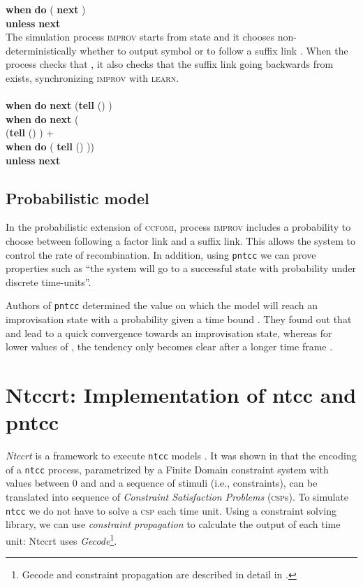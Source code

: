 \documentclass[english]{llncs}
\begin{document}
   \textbf{when}  \textbf{do} (  \textbf{next} ) \\
\hspace*{60pt} \textbf{unless}  \textbf{next}  \\

The simulation process \textsc{improv} starts from state  and it chooses non-deterministically
whether to output symbol  or to follow a suffix link . When the process checks that , it also checks that the suffix link going backwards from  exists, synchronizing \textsc{improv} with \textsc{learn}.\\

   \\
\hspace*{28pt} \textbf{when}  \textbf{do} \textbf{next} (\textbf{tell} ()  )  \\
\hspace*{24pt} \textbf{when}  \textbf{do}  \textbf{next} (\\
\hspace*{40pt} (\textbf{tell} ()  
 )  +\\
\hspace*{42pt} \textbf{when}
 \textbf{do} ( \textbf{tell} () ))\\
\hspace*{23pt} \textbf{unless}   \textbf{next}  

\subsection{Probabilistic model}
In the probabilistic extension of \textsc{ccfomi}, process \textsc{improv} includes a probability \textbf{} to choose between following a factor link and a suffix link. This allows the system to control the rate of recombination.
In addition, using \texttt{pntcc} we can prove properties such as ``the system will go to a successful state with probability  under  discrete time-units''.
 
Authors of \texttt{pntcc} determined the value on which the model will reach an improvisation state with a
probability  given 
a time bound . They found out that  and  lead to a quick convergence towards an
improvisation state, whereas for lower values of , the tendency only becomes clear after a longer time frame \cite{perez09}.

\section{Ntccrt: Implementation of ntcc and pntcc}
\textit{Ntccrt} is a framework to execute \texttt{ntcc} models \cite{toro08}.
It was shown in \cite{toro-report09} that the encoding of a 
\texttt{ntcc} process, parametrized by a Finite Domain constraint system with values between 0 and  and a sequence of stimuli (i.e., constraints), can be translated into  sequence of \textit{Constraint Satisfaction Problems} (\textsc{csp}s). To simulate \texttt{ntcc} we do not have to solve a \textsc{csp} each time unit. Using a constraint solving library, we can use \textit{constraint propagation} to calculate the output of each time unit: Ntccrt uses  \textit{Gecode}\footnote{Gecode and constraint propagation are described in detail in \cite{tack09}.}.
\end{document}
